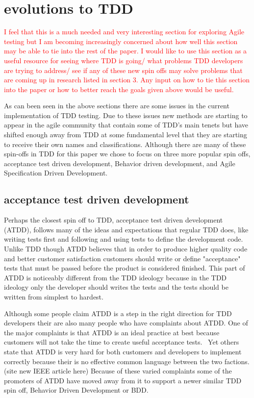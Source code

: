 \documentclass{sig-alternate}
\newcommand{\mycomment}[1]{\textcolor{red}{#1}}
\begin{document}
\section{evolutions to TDD}
\mycomment{I feel that this is a much needed and very interesting section for exploring Agile testing but I am becoming increasingly concerned about how well this section may be able to tie into the rest of the paper. I would like to use this section as a useful resource for seeing where TDD is going/ what problems TDD developers are trying to address/ see if any of these new spin offs may solve problems that are coming up in research listed in section 3. Any input on how to tie this section into the paper or how to better reach the goals given above would be useful.}

As can been seen in the above sections there are some issues in the current implementation of TDD testing.  Due to these issues new methods are starting to appear in the agile community that contain some of TDD's main tenets but have shifted enough away from TDD at some fundamental level that they are starting to receive their own names and classifications.  Although there are many of these spin-offs in TDD for this paper we chose to focus on three more popular spin offs, acceptance test driven development, Behavior driven development, and Agile Specification Driven Development.

\subsection{acceptance test driven development}

Perhaps the closest spin off to TDD, acceptance test driven development (ATDD), follows many of the ideas and expectations that regular TDD does, like writing tests first and following and using tests to define the development code.  Unlike TDD though ATDD believes that in order to produce higher quality code and better customer satisfaction customers should write or define "acceptance" tests that must be passed before the product is considered finished.  This part of ATDD is noticeably different from the TDD ideology because in the TDD ideology only the developer should writes the tests and the tests should be written from simplest to hardest.~\cite{Hammond:2012}

Although some people claim ATDD is a step in the right direction for TDD developers their are also many people who have complaints about ATDD.  One of the major complaints is that ATDD is an ideal practice at best because customers will not take the time to create useful acceptance tests.~\cite{Hammond:2012} Yet others state that ATDD is very hard for both customers and developers to implement correctly because their is no effective common language between the two factions.(site new IEEE article here)  Because of these varied complaints some of the promoters of ATDD have moved away from it to support a newer similar TDD spin off, Behavior Driven Development or BDD.
\end{document}
